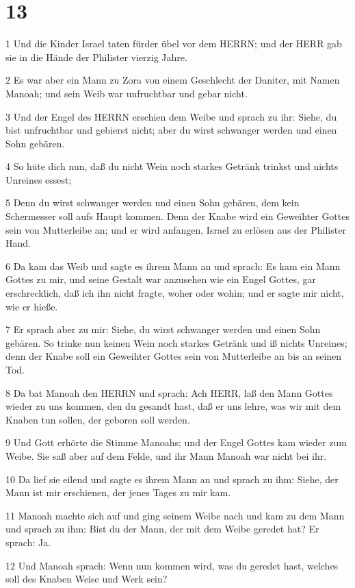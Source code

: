 \chapter{13}

\par 1 Und die Kinder Israel taten fürder übel vor dem HERRN; und der HERR gab sie in die Hände der Philister vierzig Jahre.
\par 2 Es war aber ein Mann zu Zora von einem Geschlecht der Daniter, mit Namen Manoah; und sein Weib war unfruchtbar und gebar nicht.
\par 3 Und der Engel des HERRN erschien dem Weibe und sprach zu ihr: Siehe, du bist unfruchtbar und gebierst nicht; aber du wirst schwanger werden und einen Sohn gebären.
\par 4 So hüte dich nun, daß du nicht Wein noch starkes Getränk trinkst und nichts Unreines essest;
\par 5 Denn du wirst schwanger werden und einen Sohn gebären, dem kein Schermesser soll aufs Haupt kommen. Denn der Knabe wird ein Geweihter Gottes sein von Mutterleibe an; und er wird anfangen, Israel zu erlösen aus der Philister Hand.
\par 6 Da kam das Weib und sagte es ihrem Mann an und sprach: Es kam ein Mann Gottes zu mir, und seine Gestalt war anzusehen wie ein Engel Gottes, gar erschrecklich, daß ich ihn nicht fragte, woher oder wohin; und er sagte mir nicht, wie er hieße.
\par 7 Er sprach aber zu mir: Siehe, du wirst schwanger werden und einen Sohn gebären. So trinke nun keinen Wein noch starkes Getränk und iß nichts Unreines; denn der Knabe soll ein Geweihter Gottes sein von Mutterleibe an bis an seinen Tod.
\par 8 Da bat Manoah den HERRN und sprach: Ach HERR, laß den Mann Gottes wieder zu uns kommen, den du gesandt hast, daß er uns lehre, was wir mit dem Knaben tun sollen, der geboren soll werden.
\par 9 Und Gott erhörte die Stimme Manoahs; und der Engel Gottes kam wieder zum Weibe. Sie saß aber auf dem Felde, und ihr Mann Manoah war nicht bei ihr.
\par 10 Da lief sie eilend und sagte es ihrem Mann an und sprach zu ihm: Siehe, der Mann ist mir erschienen, der jenes Tages zu mir kam.
\par 11 Manoah machte sich auf und ging seinem Weibe nach und kam zu dem Mann und sprach zu ihm: Bist du der Mann, der mit dem Weibe geredet hat? Er sprach: Ja.
\par 12 Und Manoah sprach: Wenn nun kommen wird, was du geredet hast, welches soll des Knaben Weise und Werk sein?
